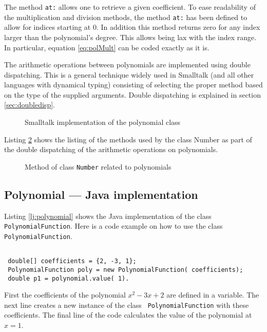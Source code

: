 \documentclass[twoside]{book}
\begin{document}
The method {\tt at:} allows one to retrieve a given coefficient.
To ease readability of the multiplication and division methods,
the method {\tt at:} has been defined to allow for indices
starting at 0. In addition this method returns zero for any index
larger than the polynomial's degree. This allows being lax with
the index range. In particular, equation \ref{eq:polMult} can be
coded exactly as it is.

The arithmetic operations between polynomials are implemented
using double dispatching. This is a general technique widely used
in Smalltalk (and all other languages with dynamical typing)
consisting of selecting the proper method based on the type of the
supplied arguments. Double dispatching is explained in section
\ref{sec:doubledisp}.


\begin{figure}
\begin{listing}
\caption{Smalltalk implementation of the polynomial class}
\label{ls:polynomial}

\end{listing}
\end{figure}

Listing \ref{ls:polynomialNumber} shows the listing of the methods
used by the class Number as part of the double dispatching of the
arithmetic operations on polynomials.

\begin{figure}
\begin{listing}
\caption{Method of class {\tt Number} related to polynomials}
\label{ls:polynomialNumber}

\end{listing}
\end{figure}

\subsection{Polynomial --- Java implementation}
 Listing \ref{lj:polynomial} shows the Java
implementation of the class {\tt PolynomialFunction}. Here is a
code example on how to use the class {\tt PolynomialFunction}.
\begin{codeExample}
\begin{verbatim}

 double[] coefficients = {2, -3, 1};
 PolynomialFunction poly = new PolynomialFunction( coefficients);
 double p1 = polynomial.value( 1).
\end{verbatim}
\end{codeExample}
First the coefficients of the polynomial $x^2-3x+2$ are defined in
a variable. The next line creates a new instance of the class {\tt
PolynomialFunction} with these coefficients. The final line of the
code calculates the value of the polynomial at $x=1$.
\end{document}
